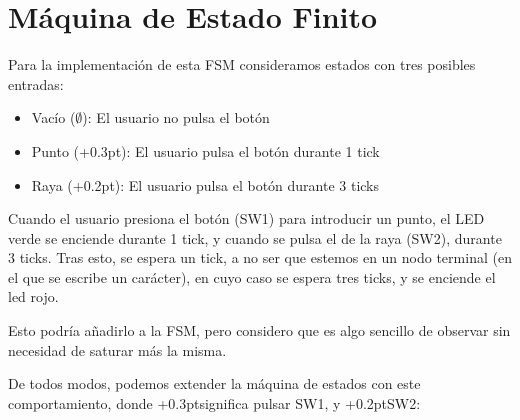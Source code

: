 \documentclass[a4paper,openright,12pt]{article}
\newcommand{\punto}{\kern+0.3pt\raisebox{0.35ex}{\huge\textbf.}}
\newcommand{\raya}{\kern+0.2pt\raisebox{-0.35ex}{\huge\textbf-}}
\begin{document}
\section{Máquina de Estado Finito}
Para la implementación de esta FSM consideramos estados con tres posibles entradas:
\begin{itemize}
    \item Vacío ($\emptyset$): El usuario no pulsa el botón
    \item Punto (\punto): El usuario pulsa el botón durante 1 tick
    \item Raya (\raya): El usuario pulsa el botón durante 3 ticks
\end{itemize}

Cuando el usuario presiona el botón (SW1) para introducir un punto, el LED verde se enciende durante 1 tick, y cuando se pulsa el de la raya (SW2), durante 3 ticks.
Tras esto, se espera un tick, a no ser que estemos en un nodo terminal (en el que se escribe un carácter), en cuyo caso se espera tres ticks, y se enciende el led rojo.

Esto podría añadirlo a la FSM, pero considero que es algo sencillo de observar sin necesidad de saturar más la misma.

De todos modos, podemos extender la máquina de estados con este comportamiento, donde \punto \space significa pulsar SW1, y \raya \space SW2:
\end{document}
